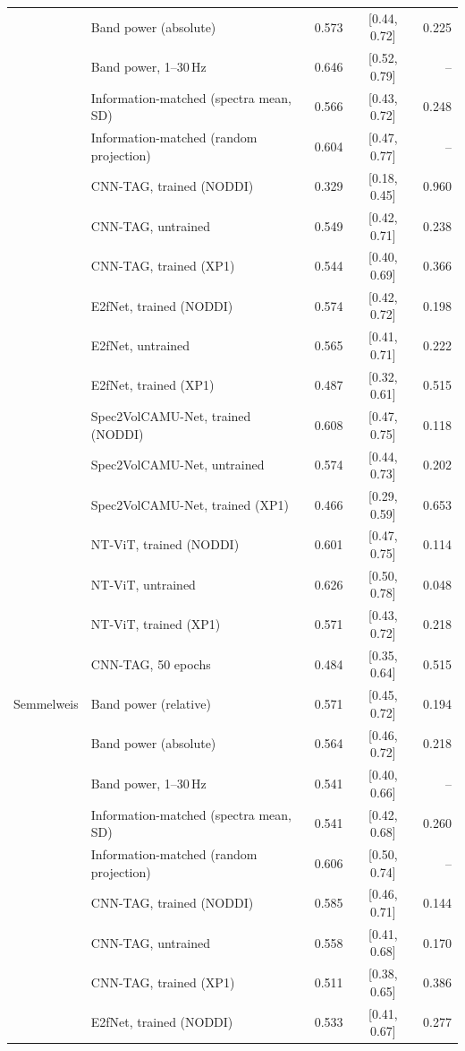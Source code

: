 \documentclass[10pt]{article}
\begin{document}
\begin{longtable}{l l r c r}
 & Band power (absolute) & 0.573 & [0.44, 0.72] & 0.225 \\
 & Band power, 1--30\,Hz & 0.646 & [0.52, 0.79] & -- \\
 & Information-matched (spectra mean, SD) & 0.566 & [0.43, 0.72] & 0.248 \\
 & Information-matched (random projection) & 0.604 & [0.47, 0.77] & -- \\
 & CNN-TAG, trained (NODDI) & 0.329 & [0.18, 0.45] & 0.960 \\
 & CNN-TAG, untrained & 0.549 & [0.42, 0.71] & 0.238 \\
 & CNN-TAG, trained (XP1) & 0.544 & [0.40, 0.69] & 0.366 \\
 & E2fNet, trained (NODDI) & 0.574 & [0.42, 0.72] & 0.198 \\
 & E2fNet, untrained & 0.565 & [0.41, 0.71] & 0.222 \\
 & E2fNet, trained (XP1) & 0.487 & [0.32, 0.61] & 0.515 \\
 & Spec2VolCAMU-Net, trained (NODDI) & 0.608 & [0.47, 0.75] & 0.118 \\
 & Spec2VolCAMU-Net, untrained & 0.574 & [0.44, 0.73] & 0.202 \\
 & Spec2VolCAMU-Net, trained (XP1) & 0.466 & [0.29, 0.59] & 0.653 \\
 & NT-ViT, trained (NODDI) & 0.601 & [0.47, 0.75] & 0.114 \\
 & NT-ViT, untrained & 0.626 & [0.50, 0.78] & 0.048 \\
 & NT-ViT, trained (XP1) & 0.571 & [0.43, 0.72] & 0.218 \\
 & CNN-TAG, 50 epochs & 0.484 & [0.35, 0.64] & 0.515 \\
\midrule
Semmelweis & Band power (relative) & 0.571 & [0.45, 0.72] & 0.194 \\
 & Band power (absolute) & 0.564 & [0.46, 0.72] & 0.218 \\
 & Band power, 1--30\,Hz & 0.541 & [0.40, 0.66] & -- \\
 & Information-matched (spectra mean, SD) & 0.541 & [0.42, 0.68] & 0.260 \\
 & Information-matched (random projection) & 0.606 & [0.50, 0.74] & -- \\
 & CNN-TAG, trained (NODDI) & 0.585 & [0.46, 0.71] & 0.144 \\
 & CNN-TAG, untrained & 0.558 & [0.41, 0.68] & 0.170 \\
 & CNN-TAG, trained (XP1) & 0.511 & [0.38, 0.65] & 0.386 \\
 & E2fNet, trained (NODDI) & 0.533 & [0.41, 0.67] & 0.277 \\

\end{longtable}
\end{document}
